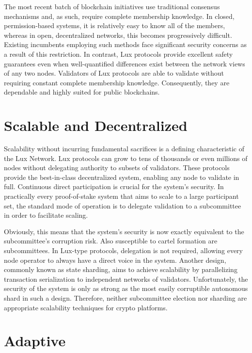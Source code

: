 \documentclass[11pt]{article}
\begin{document}
The most recent batch of blockchain initiatives use traditional consensus mechanisms and, as such, require complete membership knowledge. In closed, permission-based systems, it is relatively easy to know all of the members, whereas in open, decentralized networks, this becomes progressively difficult. Existing incumbents employing such methods face significant security concerns as a result of this restriction. In contrast, Lux protocols provide excellent safety guarantees even when well-quantified differences exist between the network views of any two nodes. Validators of Lux protocols are able to validate without requiring constant complete membership knowledge. Consequently, they are dependable and highly suited for public blockchains.


\section{Scalable and Decentralized}

Scalability without incurring fundamental sacrifices is a defining characteristic of the Lux Network. Lux protocols can grow to tens of thousands or even millions of nodes without delegating authority to subsets of validators. These protocols provide the best-in-class decentralized system, enabling any node to validate in full. Continuous direct participation is crucial for the system's security. In practically every proof-of-stake system that aims to scale to a large participant set, the standard mode of operation is to delegate validation to a subcommittee in order to facilitate scaling.


Obviously, this means that the system's security is now exactly equivalent to the subcommittee's corruption risk. Also susceptible to cartel formation are subcommittees. In Lux-type protocols, delegation is not required, allowing every node operator to always have a direct voice in the system. Another design, commonly known as state sharding, aims to achieve scalability by parallelizing transaction serialization to independent networks of validators. Unfortunately, the security of the system is only as strong as the most easily corruptible autonomous shard in such a design. Therefore, neither subcommittee election nor sharding are appropriate scalability techniques for crypto platforms.


\section{Adaptive}
\end{document}
